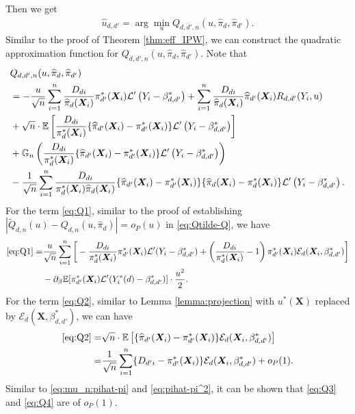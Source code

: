 \documentclass[11pt]{article}
\numberwithin{equation}{section}
\begin{document}
Then we get
\begin{align*}
	\widehat{u}_{d,d'}=\arg\min_{u} Q_{d,d',n}(u,\widehat{\pi}_d,\widehat{\pi}_{d'}).
\end{align*}
Similar to the proof of Theorem \ref{thm:eff_IPW}, we can construct the quadratic approximation function for $Q_{d,d',n}(u,\widehat{\pi}_d,\widehat{\pi}_{d'})$. Note that
\begin{align}
	&Q_{d,d',n}(u,\widehat{\pi}_d,\widehat{\pi}_{d'})\notag\\
	&=-\frac{u}{\sqrt{n}}\sum_{i=1}^n\frac{D_{di}}{\widehat{\pi}_{d}(\boldsymbol{X}_{i})}{\pi}^*_{d'}(\boldsymbol{X}_{i}) \mathcal{L}'\left(Y_i-\beta_{d,d'}^*\right)+\sum_{i=1}^n\frac{D_{di}}{\widehat{\pi}_{d}(\boldsymbol{X}_{i})}\widehat{\pi}_{d'}(\boldsymbol{X}_{i})R_{d,d'}(Y_i,u)\label{eq:Q1} \\
	&+\sqrt{n}\cdot\mathbb{E}\left[\frac{D_{di}}{{\pi}^*_{d}(\boldsymbol{X}_{i})}\{\widehat{\pi}_{d'}(\boldsymbol{X}_{i})-{\pi}^*_{d'}(\boldsymbol{X}_{i})\} \mathcal{L}'\left(Y_i-\beta_{d,d'}^*\right)\right] \label{eq:Q2}\\
	&+\mathbb{G}_n\left(\frac{D_{di}}{{\pi}^*_{d}(\boldsymbol{X}_{i})}\{\widehat{\pi}_{d'}(\boldsymbol{X}_{i})-{\pi}^*_{d'}(\boldsymbol{X}_{i})\} \mathcal{L}'\left(Y_i-\beta_{d,d'}^*\right)\right) \label{eq:Q3}\\
	&-\frac{1}{\sqrt{n}}\sum_{i=1}^n\frac{D_{di}}{{\pi}^*_{d}(\boldsymbol{X}_{i})\widehat{\pi}_{d}(\boldsymbol{X}_{i})}\{\widehat{\pi}_{d'}(\boldsymbol{X}_{i})-{\pi}^*_{d'}(\boldsymbol{X}_{i})\}\{\widehat{\pi}_{d}(\boldsymbol{X}_{i})-{\pi}^*_{d}(\boldsymbol{X}_{i})\} \mathcal{L}'\left(Y_i-\beta_{d,d'}^*\right). \label{eq:Q4}
\end{align}
For the term  \eqref{eq:Q1}, similar to the proof of establishing $|\widetilde{Q}_{d,n}(u)-Q_{d,n}(u,\widehat{\pi}_d)|=o_P(u)$ in \eqref{eq:Qtilde-Q}, we have
\begin{align*}
	\eqref{eq:Q1}=&\frac{u}{\sqrt{n}}\sum_{i=1}^n\bigg[-\frac{D_{di}}{{\pi}^*_d(\boldsymbol{X}_{i})}\pi_{d'}^*(\boldsymbol{X}_{i})\mathcal{L}'(Y_i-\beta_{d,d'}^*)+\left(\frac{D_{di}}{\pi_d^*(\boldsymbol{X}_{i})}-1\right)\pi_{d'}^*(\boldsymbol{X}_{i})\mathcal{E}_{d}(\boldsymbol{X}_{i},\beta_{d,d'}^*) \bigg]\\
	&-\partial_{\beta}\mathbb{E}[\pi_{d'}^*(\boldsymbol{X}_{i})\mathcal{L}'(Y^*_i(d)-\beta_{d,d'}^*)]\cdot \frac{u^2}{2}.
\end{align*}
For the term \eqref{eq:Q2}, similar to Lemma \ref{lemma:projection} with $u^*(\boldsymbol{X})$ replaced by $\mathcal{E}_{d}(\boldsymbol{X},\beta_{d,d'}^*)$,  we can have
\begin{align*}
	\eqref{eq:Q2}=&\sqrt{n}\cdot\mathbb{E}\left[\{\widehat{\pi}_{d'}(\boldsymbol{X}_{i})-{\pi}^*_{d'}(\boldsymbol{X}_{i})\} \mathcal{E}_{d}(\boldsymbol{X}_{i},\beta_{d,d'}^*)\right]\\
	=&\frac{1}{\sqrt{n}}\sum_{i=1}^n\{D_{d'i}-{\pi}^*_{d'}(\boldsymbol{X}_{i})\}\mathcal{E}_{d}(\boldsymbol{X}_{i},\beta_{d,d'}^*)+o_P(1).
\end{align*}
Similar to \eqref{eq:mu_n:pihat-pi} and \eqref{eq:pihat-pi^2}, it can be shown that \eqref{eq:Q3} and \eqref{eq:Q4} are of $o_P(1)$.
\end{document}
